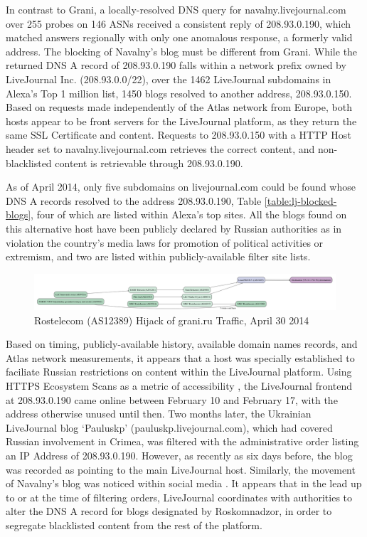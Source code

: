 In contrast to Grani, a locally-resolved DNS query for navalny.livejournal.com
over 255 probes on 146 ASNs received a consistent reply of 208.93.0.190, which
matched answers regionally with only one anomalous response, a formerly valid
address. The blocking of Navalny's blog must be different from Grani. While the
returned DNS A record of 208.93.0.190 falls within a network prefix owned by
LiveJournal Inc. (208.93.0.0/22), over the 1462 LiveJournal subdomains in
Alexa's Top 1 million list, 1450 blogs resolved to another address, 208.93.0.150.
Based on requests made independently of the Atlas network from Europe, both hosts appear to be front servers for the LiveJournal platform, as they return
the same SSL Certificate and content. Requests to 208.93.0.150
with a HTTP Host header set to navalny.livejournal.com retrieves the correct
content, and non-blacklisted content is retrievable through 208.93.0.190.

As of April 2014, only five subdomains on livejournal.com could be found whose
DNS A records resolved to the address 208.93.0.190, Table
\ref{table:lj-blocked-blogs}, four of which are listed within Alexa's top sites. All
the blogs found on this alternative host have been publicly declared by Russian
authorities as in violation the country's media laws for promotion of political
activities or extremism, and two are listed within publicly-available filter
site lists. 

\begin{figure}
  \includegraphics[width=\textwidth]{resources/atlas_cache-results-measurement_id-1663748.png}
  \caption{Rostelecom (AS12389) Hijack of grani.ru Traffic, April 30 2014}
  \label{image:ru-grani-hijack}
\end{figure}

Based on timing, publicly-available history, available domain names records,
and Atlas network measurements, it appears that a host was specially
established to faciliate Russian restrictions on content within the LiveJournal platform. 
Using HTTPS Ecosystem Scans as a metric of accessibility
\cite{projectsonar}, the LiveJournal frontend at 208.93.0.190 came online
between February 10 and February 17, with the address otherwise unused until
then. Two months later, the Ukrainian LiveJournal blog `Pauluskp'
(pauluskp.livejournal.com), which had covered Russian involvement in Crimea,
was filtered with the administrative order listing an IP Address of
208.93.0.190. However, as recently as six days before, the blog was recorded as
pointing to the main LiveJournal host. Similarly, the movement of Navalny's
blog was noticed within social media \cite{miptru2014}. It appears that in the
lead up to or at the time of filtering orders, LiveJournal coordinates with
authorities to alter the DNS A record for blogs designated by Roskomnadzor, in
order to segregate blacklisted content from the rest of the platform.

